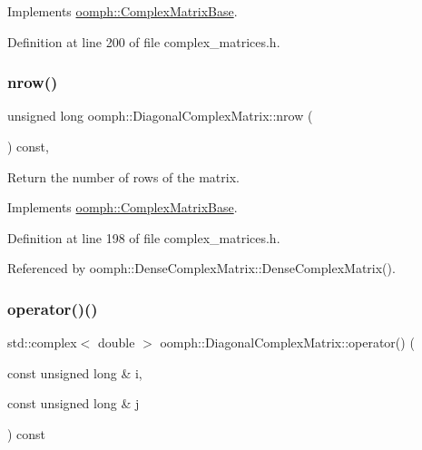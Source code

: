 Implements \hyperlink{classoomph_1_1ComplexMatrixBase_a849b63e50dad36ca8b20b7bdefd34b8d}{oomph\+::\+Complex\+Matrix\+Base}.



Definition at line 200 of file complex\+\_\+matrices.\+h.

\mbox{\label{classoomph_1_1DiagonalComplexMatrix_a9a58381c1aa8d680373305a27bc88c25}} 
\subsubsection{\texorpdfstring{nrow()}{nrow()}}
{\footnotesize\ttfamily unsigned long oomph\+::\+Diagonal\+Complex\+Matrix\+::nrow (\begin{DoxyParamCaption}{ }\end{DoxyParamCaption}) const\hspace{0.3cm}{\ttfamily [inline]}, {\ttfamily [virtual]}}



Return the number of rows of the matrix. 



Implements \hyperlink{classoomph_1_1ComplexMatrixBase_adcbdf19bc82c61c0a4fbfd8c8de97b3b}{oomph\+::\+Complex\+Matrix\+Base}.



Definition at line 198 of file complex\+\_\+matrices.\+h.



Referenced by oomph\+::\+Dense\+Complex\+Matrix\+::\+Dense\+Complex\+Matrix().

\mbox{\label{classoomph_1_1DiagonalComplexMatrix_aa8f257263497d498f52881a19281ce63}} 
\subsubsection{\texorpdfstring{operator()()}{operator()()}\hspace{0.1cm}{\footnotesize\ttfamily [1/2]}}
{\footnotesize\ttfamily std\+::complex$<$ double $>$ oomph\+::\+Diagonal\+Complex\+Matrix\+::operator() (\begin{DoxyParamCaption}\item[{const unsigned long \&}]{i,  }\item[{const unsigned long \&}]{j }\end{DoxyParamCaption}) const\hspace{0.3cm}{\ttfamily [virtual]}}



